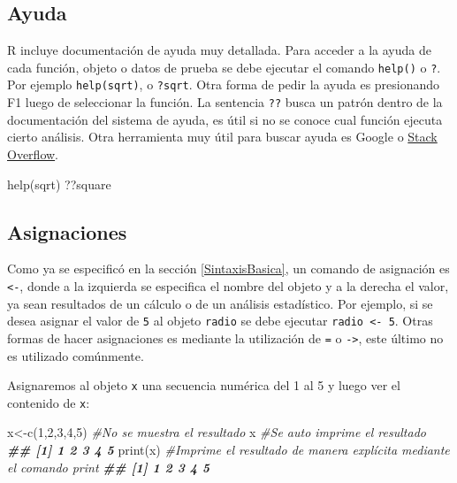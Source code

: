 \documentclass[
]{book}
\newenvironment{Shaded}{\begin{snugshade}}{\end{snugshade}}
\newcommand{\CommentTok}[1]{\textcolor[rgb]{0.56,0.35,0.01}{\textit{#1}}}
\newcommand{\DecValTok}[1]{\textcolor[rgb]{0.00,0.00,0.81}{#1}}
\newcommand{\DocumentationTok}[1]{\textcolor[rgb]{0.56,0.35,0.01}{\textbf{\textit{#1}}}}
\newcommand{\FunctionTok}[1]{\textcolor[rgb]{0.00,0.00,0.00}{#1}}
\newcommand{\NormalTok}[1]{#1}
\newcommand{\OtherTok}[1]{\textcolor[rgb]{0.56,0.35,0.01}{#1}}
\begin{document}
\hypertarget{ayuda}{%
\subsection{Ayuda}\label{ayuda}}

R incluye documentación de ayuda muy detallada. Para acceder a la ayuda de cada función, objeto o datos de prueba se debe ejecutar el comando \texttt{help()} o \texttt{?}. Por ejemplo \texttt{help(sqrt)}, o \texttt{?sqrt}. Otra forma de pedir la ayuda es presionando F1 luego de seleccionar la función. La sentencia \texttt{??} busca un patrón dentro de la documentación del sistema de ayuda, es útil si no se conoce cual función ejecuta cierto análisis. Otra herramienta muy útil para buscar ayuda es Google o \href{https://stackoverflow.com/}{Stack Overflow}.

\begin{Shaded}
\begin{Highlighting}[]
\FunctionTok{help}\NormalTok{(sqrt)}
\NormalTok{??square}
\end{Highlighting}
\end{Shaded}

\hypertarget{asignaciones}{%
\subsection{Asignaciones}\label{asignaciones}}

Como ya se especificó en la sección \ref{SintaxisBasica}, un comando de asignación es \texttt{\textless{}-}, donde a la izquierda se especifica el nombre del objeto y a la derecha el valor, ya sean resultados de un cálculo o de un análisis estadístico. Por ejemplo, si se desea asignar el valor de \texttt{5} al objeto \texttt{radio} se debe ejecutar \texttt{radio\ \textless{}-\ 5}. Otras formas de hacer asignaciones es mediante la utilización de \texttt{=} o \texttt{-\textgreater{}}, este último no es utilizado comúnmente.

Asignaremos al objeto \texttt{x} una secuencia numérica del 1 al 5 y luego ver el contenido de \texttt{x}:

\begin{Shaded}
\begin{Highlighting}[]
\NormalTok{x}\OtherTok{\textless{}{-}}\FunctionTok{c}\NormalTok{(}\DecValTok{1}\NormalTok{,}\DecValTok{2}\NormalTok{,}\DecValTok{3}\NormalTok{,}\DecValTok{4}\NormalTok{,}\DecValTok{5}\NormalTok{)  }\CommentTok{\#No se muestra el resultado}
\NormalTok{x                }\CommentTok{\#Se auto imprime el resultado}
\DocumentationTok{\#\# [1] 1 2 3 4 5}
\FunctionTok{print}\NormalTok{(x)         }\CommentTok{\#Imprime el resultado de manera explícita mediante el comando print }
\DocumentationTok{\#\# [1] 1 2 3 4 5}
\end{Highlighting}
\end{Shaded}
\end{document}
